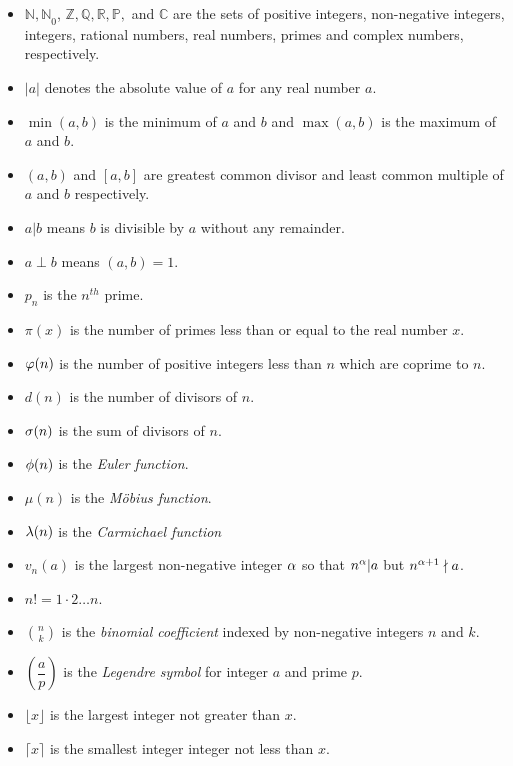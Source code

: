 \documentclass{subfile}
\begin{document}
		\begin{itemize}
			\item $\mathbb{N,N}_0$, $\mathbb{Z, Q, R, P},$ and $\mathbb{C}$ are the sets of positive integers, non-negative integers, integers, rational numbers, real numbers, primes and complex numbers, respectively.
			\item $|a|$ denotes the absolute value of $a$ for any real number $a$.
			\item $\min(a,b)$ is the minimum of $a$ and $b$ and $\max(a,b)$ is the maximum of $a$ and $b$.
			\item $(a,b)$ and $[a,b]$ are greatest common divisor and least common multiple of $a$ and $b$ respectively.
			\item $a|b$ means $b$ is divisible by $a$ without any remainder.
			\item $a\perp b$ means $(a,b)=1$.
			\item $p_n$ is the $n^{th}$ prime.
			\item $\pi(x)$ is the number of primes less than or equal to the real number $x$.		
			\item $\varphi(n)$ is the number of positive integers less than $n$ which are coprime to $n$.
			\item $d(n)$ is the number of divisors of $n$.
			\item $\sigma(n)$ is the sum of divisors of $n$.
			\item $\phi(n)$ is the {\it Euler function}.
			\item $\mu(n)$ is the {\it M\"{o}bius function}.
			\item $\lambda(n)$ is the {\it Carmichael function}
			\item $v_n(a)$ is the largest non-negative integer $\alpha$ so that $n^\alpha|a$ but $n^{\alpha+1}\nmid a$.
			\item $n!=1\cdot2\dots n$.
			\item $\displaystyle \binom{n}{k}$ is the \textit{binomial coefficient} indexed by non-negative integers $n$ and $k$.
			\item $\left(\dfrac{a}{p}\right)$ is the \textit{Legendre symbol} for integer $a$ and prime $p$.
			\item $\lfloor x \rfloor$ is the  largest integer not greater than $x$.
			\item $\lceil x \rceil$ is the smallest integer integer not less than $x$.
		\end{itemize}
	
		\newpage
\end{document}
